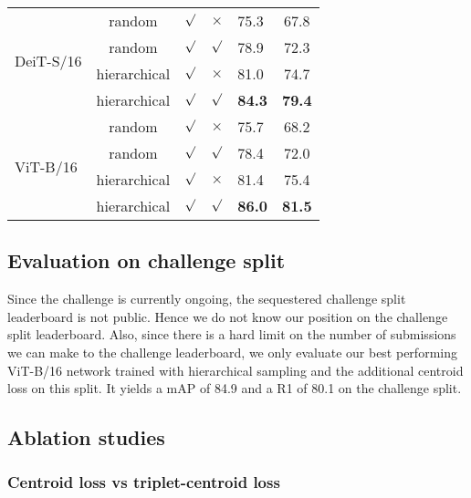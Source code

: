 \documentclass{article}
\begin{document}
\begin{table}
\begin{tabular}{@{}lccclc@{}}
    \multirow{4}{*}[-5pt]{DeiT-S/16} & random & $\surd$ & $\times$ & 75.3 & 67.8\\
\addlinespace[0.5em]
    & random & $\surd$ & $\surd$ & 78.9 & 72.3\\
\addlinespace[0.5em]
    & hierarchical & $\surd$ & $\times$ & 81.0 & 74.7 \\
\addlinespace[0.5em]
    & hierarchical & $\surd$ & $\surd$ & \textbf{84.3} & \textbf{79.4}\\
    \midrule

    \multirow{4}{*}[-5pt]{ViT-B/16} & random & $\surd$ & $\times$ & 75.7 & 68.2 \\
\addlinespace[0.5em]
    & random & $\surd$ & $\surd$ & 78.4 & 72.0\\
\addlinespace[0.5em]
    & hierarchical & $\surd$ & $\times$ & 81.4 & 75.4\\
\addlinespace[0.5em]
    & hierarchical & $\surd$ & $\surd$ & \textbf{86.0} & \textbf{81.5}\\

    \bottomrule
  \end{tabular}
\end{table}

\subsection{Evaluation on challenge split}

Since the challenge is currently ongoing, the sequestered challenge split leaderboard is not public. Hence we do not know our position on the challenge split leaderboard. Also, since there is a hard limit on the number of submissions we can make to the challenge leaderboard, we only evaluate our best performing ViT-B/16 network trained with hierarchical sampling and the additional centroid loss on this split. It yields a mAP of 84.9 and a R1 of 80.1 on the challenge split.

\subsection{Ablation studies}















\subsubsection{Centroid loss vs triplet-centroid loss}
\label{sec:centroid_vs_triplet_centroid}
\end{document}
